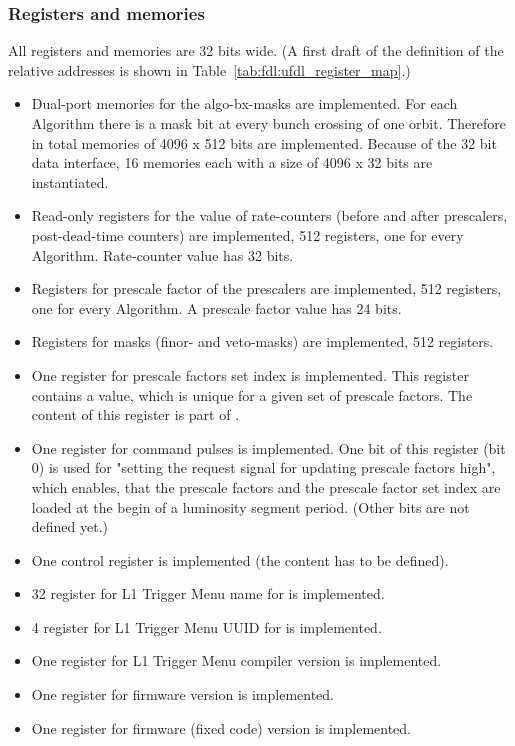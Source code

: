 \subsubsection{Registers and memories}
\label{sec:fdl:reg_mem}

All registers and memories are 32 bits wide. (A first draft of the definition of the relative addresses is shown in Table~\ref{tab:fdl:ufdl_register_map}.)

\begin {itemize}
\item Dual-port memories for the algo-bx-masks are implemented. For each Algorithm there is a mask bit at every bunch crossing of one orbit. Therefore in total memories of 4096 x 512 bits
are implemented. Because of the 32 bit data interface, 16 memories each with a size of 4096 x 32 bits are instantiated.
\item Read-only registers for the value of rate-counters (before and after prescalers, post-dead-time counters) are implemented, 512 registers, one for every Algorithm. Rate-counter value has 32 bits.
\item Registers for prescale factor of the prescalers are implemented, 512 registers, one for every Algorithm. A prescale factor value has 24 bits.
\item Registers for masks (finor- and veto-masks) are implemented, 512 registers.
\item One register for prescale factors set index is implemented. This register contains a value, which is unique for a given set of prescale factors. The content of this register is
part of \record.
\item One register for command pulses is implemented. One bit of this register (bit 0) is used for "setting the request signal for updating prescale factors high", which enables, that the prescale factors and the prescale factor set index
are loaded at the begin of a luminosity segment period. (Other bits are not defined yet.)
\item One control register is implemented (the content has to be defined).
\item 32 register for L1 Trigger Menu name for \ugtl is implemented.
\item 4 register for L1 Trigger Menu UUID for \ugtl is implemented.
\item One register for L1 Trigger Menu compiler version is implemented.
\item One register for \ufdl firmware version is implemented.
\item One register for \ugtl firmware (fixed code) version is implemented.
\end {itemize}

